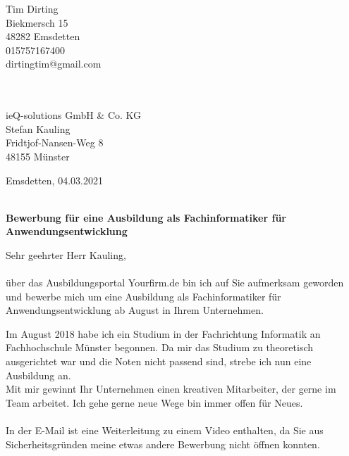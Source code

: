 \documentclass[12pt,twoside,a4paper]{scrlttr2}
\begin{document}
	
	\begin{letter}
		
			\begin{flushright}
				Tim Dirting \\
				Biekmersch 15\\ 
				48282 Emsdetten \\
				015757167400 \\
				dirtingtim@gmail.com\\  
				  \, \\
				  \, \\
			\end{flushright}
		
			\begin{flushleft}
				ieQ-solutions GmbH \& Co. KG\\
				Stefan Kauling \\
				Fridtjof-Nansen-Weg 8\\ 
				48155 Münster\\ 
			
	
			\end{flushleft}
	
			\begin{flushright}
			Emsdetten, 04.03.2021\\
			\end{flushright}

			\textbf{ \\ Bewerbung f\"ur eine Ausbildung als Fachinformatiker f\"ur Anwendungsentwicklung}

			\begin{flushleft}
			Sehr geehrter Herr Kauling,\\
			 \, \\		
			 
			über das Ausbildungsportal Yourfirm.de bin ich auf Sie aufmerksam geworden und bewerbe mich um eine Ausbildung als Fachinformatiker für Anwendungsentwicklung ab August in Ihrem Unternehmen.
			
		   
			Im August 2018 habe ich ein Studium in der Fachrichtung Informatik an Fachhochschule Münster begonnen. Da mir das Studium zu theoretisch ausgerichtet war und die Noten nicht passend sind, strebe ich nun eine Ausbildung an.		\\	
			Mit mir gewinnt Ihr Unternehmen einen kreativen Mitarbeiter, der gerne im Team arbeitet. Ich gehe gerne neue Wege bin immer offen für Neues.\\
			\,\\
			In der E-Mail ist eine Weiterleitung zu einem Video enthalten, da Sie aus Sicherheitsgründen meine etwas andere Bewerbung nicht öffnen konnten.
		

\end{flushleft}
\end{letter}
\end{document}
